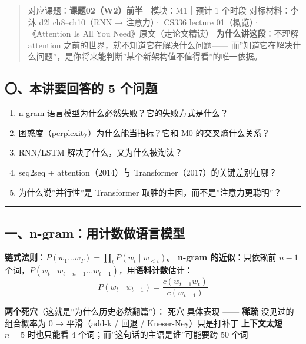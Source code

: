 \documentclass[
  chinese,
  11pt,
]{ctexart}
\providecommand{\tightlist}{%
  \setlength{\itemsep}{0pt}\setlength{\parskip}{0pt}}
\begin{document}
\begin{quote}
对应课题：\textbf{课题02（W2）前半}｜模块：M1｜预计 1 个时段 对标材料：李沐 d2l ch8--ch10（RNN → 注意力）· CS336 lecture 01（概览）· 《Attention Is All You Need》原文（走论文精读） \textbf{为什么讲这段}：不理解 attention 之前的世界，就不知道它在解决什么问题------ 而''知道它在解决什么问题''，是你将来能判断''某个新架构值不值得看''的唯一依据。
\end{quote}

\subsection{〇、本讲要回答的 5 个问题}\label{ux672cux8bb2ux8981ux56deux7b54ux7684-5-ux4e2aux95eeux9898-1}

\begin{enumerate}
\def\labelenumi{\arabic{enumi}.}
\tightlist
\item
  n-gram 语言模型为什么必然失败？它的失败方式是什么？
\item
  困惑度（perplexity）为什么能当指标？它和 M0 的交叉熵什么关系？
\item
  RNN/LSTM 解决了什么，又为什么被淘汰？
\item
  seq2seq + attention（2014）与 Transformer（2017）的关键差别在哪？
\item
  为什么说''并行性''是 Transformer 取胜的主因，而不是''注意力更聪明''？
\end{enumerate}

\begin{center}\rule{0.5\linewidth}{0.5pt}\end{center}

\subsection{一、n-gram：用计数做语言模型}\label{ux4e00n-gramux7528ux8ba1ux6570ux505aux8bedux8a00ux6a21ux578b}

\textbf{链式法则}：\(P(w_1\dots w_T) = \prod_t P(w_t \mid w_{<t})\)。 \textbf{n-gram 的近似}：只依赖前 \(n-1\) 个词，\(P(w_t\mid w_{t-n+1}\dots w_{t-1})\)，用\textbf{语料计数}估计： \[P(w_t\mid w_{t-1}) = \frac{c(w_{t-1}w_t)}{c(w_{t-1})}\]

\textbf{两个死穴}（这就是''为什么历史必然翻篇''）： \textbar{} 死穴 \textbar{} 具体表现 \textbar{} \textbar---\textbar---\textbar{} \textbar{} \textbf{稀疏} \textbar{} 没见过的组合概率为 0 → 平滑（add-k / 回退 / Kneser-Ney）只是打补丁 \textbar{} \textbar{} \textbf{上下文太短} \textbar{} \(n=5\) 时也只能看 4 个词；而''这句话的主语是谁''可能要跨 50 个词 \textbar{}
\end{document}

